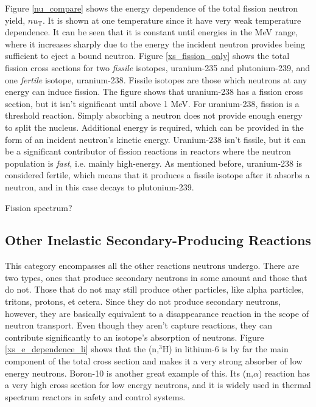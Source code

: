 Figure \ref{nu_compare} shows the energy dependence of the total fission neutron yield, $nu_\mathrm{T}$. It is shown at one temperature since it have very weak temperature dependence.   It can be seen that it is constant until energies in the MeV range, where it increases sharply due to the energy the incident neutron provides being sufficient to eject a bound neutron.  Figure \ref{xs_fission_only} shows the total fission cross sections for two \emph{fissile} isotopes, uranium-235 and plutonium-239, and one \emph{fertile} isotope, uranium-238.  Fissile isotopes are those which neutrons at any energy can induce fission.  The figure shows that uranium-238 has a fission cross section, but it isn't significant until above 1 MeV.  For uranium-238, fission is a threshold reaction.  Simply absorbing a neutron does not provide enough energy to split the nucleus.  Additional energy is required, which can be provided in the form of an incident neutron's kinetic energy.  Uranium-238 isn't fissile, but it can be a significant contributor of fission reactions in reactors where the neutron population is \emph{fast}, i.e. mainly high-energy.  As mentioned before, uranium-238 is considered fertile, which means that it produces a fissile isotope after it absorbs a neutron, and in this case decays to plutonium-239.  

Fission spectrum?

\subsection{Other Inelastic Secondary-Producing Reactions}

This category encompasses all the other reactions neutrons undergo.  There are two types, ones that produce secondary neutrons in some amount and those that do not.  Those that do not may still produce other particles, like alpha particles, tritons, protons, et cetera.  Since they do not produce secondary neutrons, however, they are basically equivalent to a disappearance reaction in the scope of neutron transport.  Even though they aren't capture reactions, they can contribute significantly to an isotope's absorption of neutrons.  Figure \ref{xs_e_dependence_li} shows that the (n,$^3$H) in lithium-6 is by far the main component of the total cross section and makes it a very strong absorber of low energy neutrons.  Boron-10 is another great example of this.  Its (n,$\alpha$) reaction has a very high cross section for low energy neutrons, and it is widely used in thermal spectrum reactors in safety and control systems.

